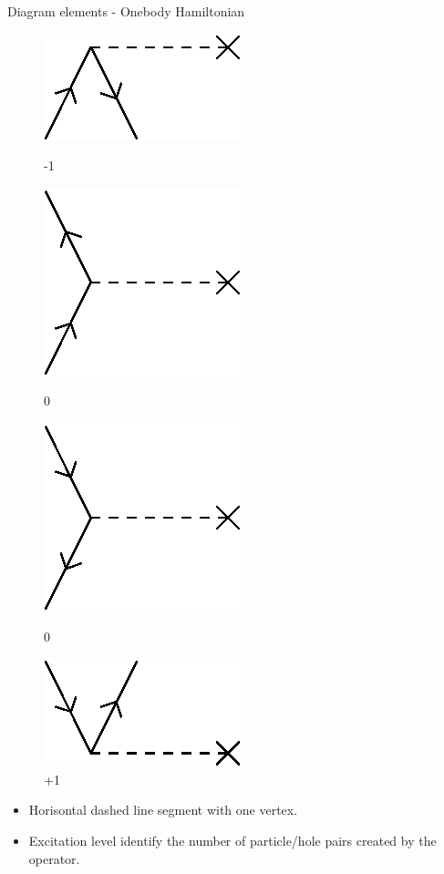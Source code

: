 \begin{frame}{Diagram elements - Onebody Hamiltonian}

    \renewcommand{\figurename}{Level}

    \begin{figure}
    \centering
    \parbox{0.20\textwidth}{
            \centering
            \includegraphics[scale=0.65]{graphics/f1}
            \caption{-1}
        }
        \parbox{0.20\textwidth}{
            \centering
            \includegraphics[scale=0.65]{graphics/f2}
            \caption{0}
        }
        \parbox{0.20\textwidth}{
            \centering
            \includegraphics[scale=0.65]{graphics/f3}
            \caption{0}
        }
        \parbox{0.20\textwidth}{
            \centering
            \includegraphics[scale=0.65]{graphics/f4}
            \caption{+1}
        }
    \end{figure}

    \begin{itemize}
        \item Horisontal dashed line segment with one vertex.
        \item Excitation level identify the number of particle/hole pairs created by the operator.
    \end{itemize}
\end{frame}

